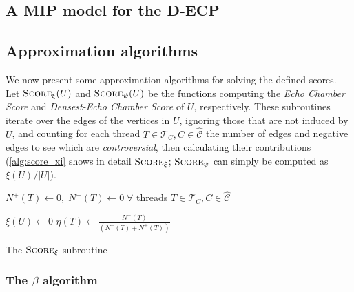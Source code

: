 \subsection{A MIP model for the \acrshort{D-ECP}}%
\label{sub:a_mip_model_for_the_ecp}

\subsection{Approximation algorithms}%
\label{sub:approximation_algorithms}

We now present some approximation algorithms for solving the defined scores.
Let $\textsc{Score}_{\xi} (U)$ and $\textsc{Score}_{\psi} (U)$ be the functions computing the
\emph{Echo Chamber Score} and \emph{Densest-Echo Chamber Score} of $U$,
respectively. These subroutines iterate over the edges of the vertices in $U$,
ignoring those that are not induced by $U$, and counting for each thread $T \in
	\mathcal{T}_{C}, C \in \mathcal{\hat{C}} $ the number of edges and negative edges
to see which are \emph{controversial}, then calculating their contributions
(\autoref{alg:score_xi} shows in detail $\textsc{Score}_\xi$;
$\textsc{Score}_\psi$ can simply be computed as $\xi(U)/|U|$).

\begin{algorithm}
	\SetAlgoLined
	$N^{+} (T) \leftarrow 0, \; N^{-} (T) \leftarrow 0\; \forall $ threads $T
		\in \mathcal{T}_{C}, C \in \mathcal{\hat{C}}   $ \;


	$\xi(U) \leftarrow 0$ \;
	$\eta(T) \leftarrow\frac{N^{-}(T)}{(N^{-}(T) + N^{+} (T))}$ \;

	\caption{The $\textsc{Score}_{\xi}  $ subroutine}
	\label{alg:score_xi}
\end{algorithm}

\subsubsection{The $\beta$ algorithm}%
\label{ssub:the_beta_approach}

